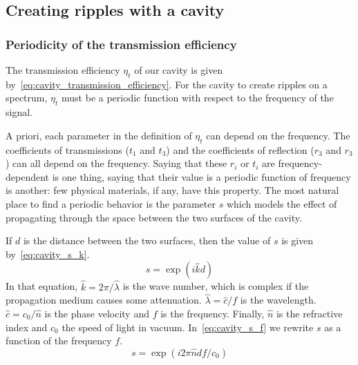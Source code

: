 
\subsection{Creating ripples with a cavity}




\subsubsection{Periodicity of the transmission efficiency}

The transmission efficiency $\eta_t$ of our cavity is given by~\cref{eq:cavity_transmission_efficiency}.
For the cavity to create ripples on a spectrum, $\eta_t$ must be a periodic function with respect to the frequency of the signal.

A priori, each parameter in the definition of $\eta_t$ can depend on the frequency.
The coefficients of transmissions ($t_1$ and $t_3$) and the coefficients of reflection ($r_3$ and $r_3$) can all depend on the frequency.
Saying that these $r_i$ or $t_i$ are frequency-dependent is one thing, saying that their value is a periodic function of frequency is another:
few physical materials, if any, have this property.
The most natural place to find a periodic behavior is the parameter $s$ which models the effect of propagating through the space between the two surfaces of the cavity.

If $d$ is the distance between the two surfaces, then the value of $s$ is given by~\cref{eq:cavity_s_k}.
\begin{equation}
    s = \exp \left( i\hat{k}d \right) \label{eq:cavity_s_k}
\end{equation}
In that equation, $\hat{k} = 2\pi / \hat{\lambda}$ is the wave number,
which is complex if the propagation medium causes some attenuation.
$\hat{\lambda} = \hat{c}/f$ is the wavelength.
$\hat{c} = c_0 / \hat{n}$ is the phase velocity and $f$ is the frequency.
Finally, $\hat{n}$ is the refractive index and $c_0$ the speed of light in vacuum.
In~\cref{eq:cavity_s_f} we rewrite $s$ as a function of the frequency $f$.
\begin{equation}
    s = \exp \left( i 2\pi \hat{n} df/c_0 \right) \label{eq:cavity_s_f}
\end{equation}

